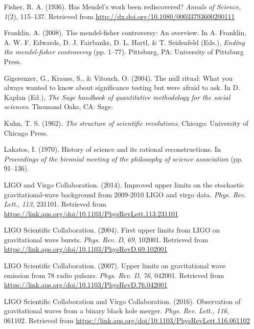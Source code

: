\documentclass[english,floatsintext,man]{apa6}
\theoremstyle{definition}
\theoremstyle{definition}
\theoremstyle{definition}
\theoremstyle{remark}
\begin{document}
\leavevmode\hypertarget{ref-Fisher:1936}{}%
Fisher, R. A. (1936). Has Mendel's work been rediscovered? \emph{Annals
of Science}, \emph{1}(2), 115--137. Retrieved from
\url{http://dx.doi.org/10.1080/00033793600200111}

\leavevmode\hypertarget{ref-Franklin:2008}{}%
Franklin, A. (2008). The mendel-fisher controversy: An overview. In A.
Franklin, A. W. F. Edwards, D. J. Fairbanks, D. L. Hartl, \& T.
Seidenfeld (Eds.), \emph{Ending the mendel-fisher controversy} (pp.
1--77). Pittsburg, PA: University of Pittsburg Press.

\leavevmode\hypertarget{ref-Gigerenzer:etal:2004}{}%
Gigerenzer, G., Krauss, S., \& Vitouch, O. (2004). The null ritual: What
you always wanted to know about significance testing but were afraid to
ask. In D. Kaplan (Ed.), \emph{The Sage handbook of quantitative
methodology for the social sciences}. Thousand Oaks, CA: Sage.

\leavevmode\hypertarget{ref-Kuhn:1962}{}%
Kuhn, T. S. (1962). \emph{The structure of scientific revolutions}.
Chicago: University of Chicago Press.

\leavevmode\hypertarget{ref-Lakatos:1970}{}%
Lakatos, I. (1970). History of science and its rational reconstructions.
In \emph{Proceedings of the biennial meeting of the philosophy of
science association} (pp. 91--136).

\leavevmode\hypertarget{ref-LIGO:2014}{}%
LIGO and Virgo Collaboration. (2014). Improved upper limits on the
stochastic gravitational-wave background from 2009-2010 LIGO and virgo
data. \emph{Phys. Rev. Lett.}, \emph{113}, 231101. Retrieved from
\url{https://link.aps.org/doi/10.1103/PhysRevLett.113.231101}

\leavevmode\hypertarget{ref-LIGO:2004}{}%
LIGO Scientific Collaboration. (2004). First upper limits from LIGO on
gravitational wave bursts. \emph{Phys. Rev. D}, \emph{69}, 102001.
Retrieved from \url{https://link.aps.org/doi/10.1103/PhysRevD.69.102001}

\leavevmode\hypertarget{ref-LIGO:2007}{}%
LIGO Scientific Collaboration. (2007). Upper limits on gravitational
wave emission from 78 radio pulsars. \emph{Phys. Rev. D}, \emph{76},
042001. Retrieved from
\url{https://link.aps.org/doi/10.1103/PhysRevD.76.042001}

\leavevmode\hypertarget{ref-LIGO:2016}{}%
LIGO Scientific Collaboration and Virgo Collaboration. (2016).
Observation of gravitational waves from a binary black hole merger.
\emph{Phys. Rev. Lett.}, \emph{116}, 061102. Retrieved from
\url{https://link.aps.org/doi/10.1103/PhysRevLett.116.061102}
\end{document}

